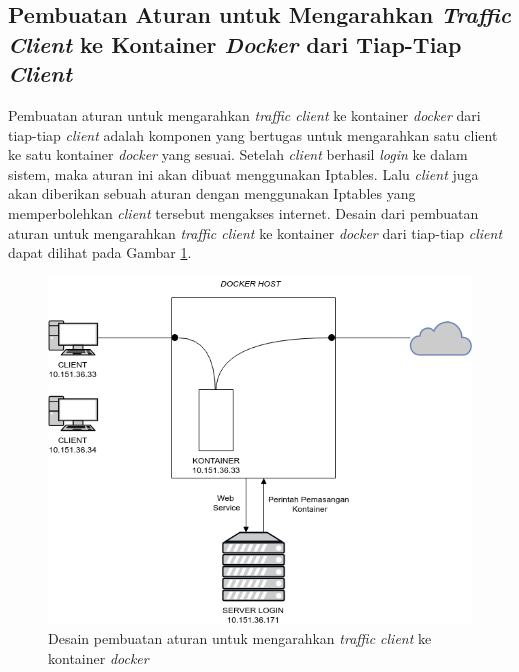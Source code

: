 \subsection{Pembuatan Aturan untuk Mengarahkan \textit{Traffic Client} ke Kontainer \textit{Docker} dari Tiap-Tiap \textit{Client}}
Pembuatan aturan untuk mengarahkan \textit{traffic client} ke kontainer \textit{docker} dari tiap-tiap \textit{client} adalah komponen yang bertugas untuk mengarahkan satu client ke satu kontainer \textit{docker} yang sesuai. Setelah \textit{client} berhasil \textit{login} ke dalam sistem, maka aturan ini akan dibuat menggunakan Iptables. Lalu \textit{client} juga akan diberikan sebuah aturan dengan menggunakan Iptables yang memperbolehkan \textit{client} tersebut mengakses internet. Desain dari pembuatan aturan untuk mengarahkan \textit{traffic client} ke kontainer \textit{docker} dari tiap-tiap \textit{client} dapat dilihat pada Gambar \ref{mengarahkankontainerdocker}.
\newline
\newline
\newline
\newline
\newline
\newline
\newline
\newline
\newline
\begin{figure}[H]
	\centering
	\includegraphics[width=\linewidth]{images/bab3/DIAGRAM3}
	\caption{Desain pembuatan aturan untuk mengarahkan \textit{traffic client} ke kontainer \textit{docker}}
	\label{mengarahkankontainerdocker}
\end{figure}

